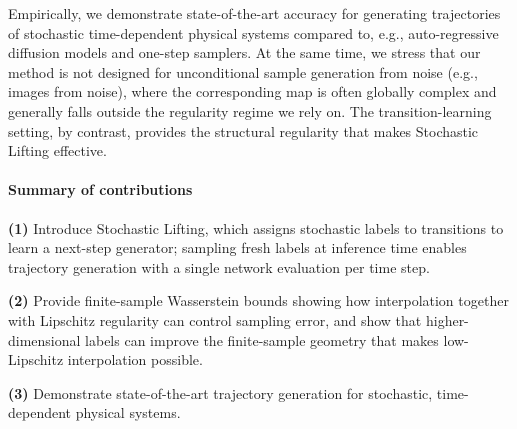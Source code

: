 \documentclass{article}
\theoremstyle{plain}
\theoremstyle{definition}
\theoremstyle{remark}
\begin{document}
Empirically, we demonstrate state-of-the-art accuracy for generating trajectories of stochastic time-dependent physical systems compared to, e.g., auto-regressive diffusion models and one-step samplers. At the same time, we stress that our method is not designed for unconditional sample generation from noise (e.g., images from noise), where the corresponding map is often globally complex and generally falls outside the regularity regime we rely on. The transition-learning setting, by contrast, provides the structural regularity that makes Stochastic Lifting effective.

\vspace*{-0.2cm}\paragraph{Summary of contributions}

\textbf{(1)} Introduce Stochastic Lifting, which assigns stochastic labels to transitions to learn a next-step generator; sampling fresh labels at inference time enables trajectory generation with a single network evaluation per time step.\vspace*{-0.1cm}

\textbf{(2)} Provide finite-sample Wasserstein bounds showing how interpolation together with Lipschitz regularity can control sampling error, and show that higher-dimensional labels can improve the finite-sample geometry that makes low-Lipschitz interpolation possible. \vspace*{-0.1cm}%


\textbf{(3)} Demonstrate state-of-the-art trajectory generation for stochastic, time-dependent physical systems.
\end{document}

